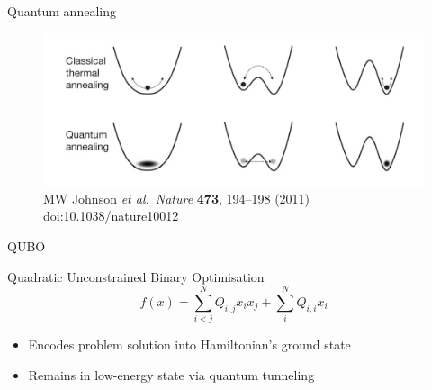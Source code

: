 \documentclass[handout]{beamer}
\begin{document}
\begin{frame}{Quantum annealing}
    \begin{figure}
        \centering
        \includegraphics[width=\textwidth]{../Figures/nature10012.png}
        \caption{MW Johnson \textit{et al.}\ \textit{Nature} \textbf{473}, 194–198 (2011) doi:10.1038/nature10012}
    \end{figure}
\end{frame}

\begin{frame}{QUBO}
    \begin{block}{Quadratic Unconstrained Binary Optimisation}
        \vspace{0.1em}
        \begin{equation*}
            f(x)=\sum^N_{i<j}Q_{i,j}x_ix_j + \sum^N_iQ_{i,i}x_i
        \end{equation*}
    \end{block}
    \begin{itemize}
        \item<2-> Encodes problem solution into Hamiltonian's ground state
        \item<2-> Remains in low-energy state via quantum tunneling
    \end{itemize}
\end{frame}
\end{document}
